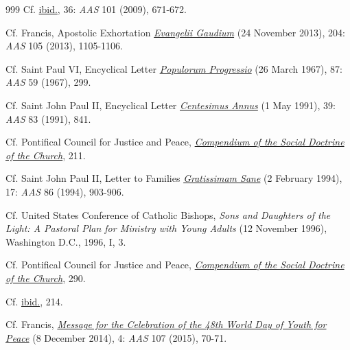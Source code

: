 \documentclass{article}
\begin{document}
\begin{thebibliography}{999}
 Cf. \href{https://www.vatican.va/content/benedict-xvi/en/encyclicals/documents/hf_ben-xvi_enc_20090629_caritas-in-veritate.html}{ibid.}, 36: \emph{AAS} 101 (2009), 671-672.

 Cf. Francis, Apostolic Exhortation \href{https://www.vatican.va/content/francesco/en/apost_exhortations/documents/papa-francesco_esortazione-ap_20131124_evangelii-gaudium.html}{\emph{Evangelii Gaudium}} (24 November 2013), 204: \emph{AAS} 105 (2013), 1105-1106.

 Cf. Saint Paul VI, Encyclical Letter \href{https://www.vatican.va/content/paul-vi/en/encyclicals/documents/hf_p-vi_enc_26031967_populorum.html}{\emph{Populorum Progressio}} (26 March 1967), 87: \emph{AAS} 59 (1967), 299.

 Cf. Saint John Paul II, Encyclical Letter \href{https://www.vatican.va/content/john-paul-ii/en/encyclicals/documents/hf_jp-ii_enc_01051991_centesimus-annus.html}{\emph{Centesimus Annus}} (1 May 1991), 39: \emph{AAS} 83 (1991), 841.

 Cf. Pontifical Council for Justice and Peace, \href{https://www.vatican.va/roman_curia/pontifical_councils/justpeace/documents/rc_pc_justpeace_doc_20060526_compendio-dott-soc_en.html}{\emph{Compendium of the Social Doctrine of the Church}}, 211.

 Cf. Saint John Paul II, Letter to Families \href{https://www.vatican.va/content/john-paul-ii/en/letters/1994/documents/hf_jp-ii_let_02021994_families.html}{\emph{Gratissimam Sane}} (2 February 1994), 17: \emph{AAS} 86 (1994), 903-906.

 Cf. United States Conference of Catholic Bishops, \emph{Sons and Daughters of the Light: A Pastoral Plan for Ministry with Young Adults} (12 November 1996), Washington D.C., 1996, I, 3.

 Cf. Pontifical Council for Justice and Peace, \href{https://www.vatican.va/roman_curia/pontifical_councils/justpeace/documents/rc_pc_justpeace_doc_20060526_compendio-dott-soc_en.html}{\emph{Compendium of the Social Doctrine of the Church}}, 290.

 Cf. \href{https://www.vatican.va/roman_curia/pontifical_councils/justpeace/documents/rc_pc_justpeace_doc_20060526_compendio-dott-soc_en.html}{ibid.}, 214.

 Cf. Francis, \href{https://www.vatican.va/content/francesco/en/messages/peace/documents/papa-francesco_20141208_messaggio-xlviii-giornata-mondiale-pace-2015.html}{\emph{Message for the Celebration of the 48th World Day of Youth for Peace}} (8 December 2014), 4: \emph{AAS} 107 (2015), 70-71.


\end{thebibliography}
\end{document}

